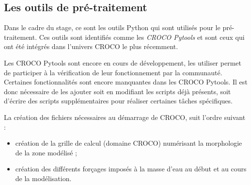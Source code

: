 \documentclass[10pt,a4paper,titlepage]{article}
\begin{document}

\subsection{Les outils de pré-traitement}
\label{sub:outils_pretraitement}
Dans le cadre du stage, ce sont les outils Python qui sont utilisés pour le pré-traitement.
Ces outils sont identifiés comme les \textit{CROCO Pytools} et sont ceux qui ont été intégrés dans l'univers CROCO le plus récemment.

Les CROCO Pytools sont encore en cours de développement, les utiliser permet de participer à la vérification de leur fonctionnement par la communauté.
Certaines fonctionnalités sont encore manquantes dans les CROCO Pytools.
Il est donc nécessaire de les ajouter soit en modifiant les scripts déjà présents, soit d'écrire des scripts supplémentaires pour réaliser certaines tâches spécifiques.

La création des fichiers nécessaires au démarrage de CROCO, suit l'ordre suivant :

\begin{itemize}
    \item création de la grille de calcul (domaine CROCO) numérisant la morphologie de la zone modélisé ;
    \item création des différents forçages imposés à la masse d'eau au début et au cours de la modélisation.
\end{itemize}
\end{document}
